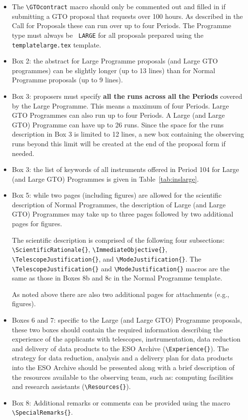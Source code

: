 \documentclass{article}
\begin{document}
\begin{itemize}
\item The \verb|\GTOcontract| macro should only be commented out and filled in if 
  submitting a GTO proposal that requests over 100 hours. As described in the Call for 
  Proposals these can run over up to four Periods. The Programme type must always be {\tt 
  LARGE} for all proposals prepared using the {\tt templatelarge.tex} template. 
\item Box 2: the abstract for Large Programme proposals (and Large GTO programmes) can be
  slightly longer (up to 13 lines) than for Normal Programme proposals
  (up to 9 lines).  
\item Box 3: proposers must specify {\bf all the runs across all the
  Periods} covered by the Large Programme. This means a maximum of four Periods. Large GTO 
  Programmes can also run up to four Periods. A Large (and Large GTO) Programme can have  
  up to 26 runs. Since the space for the runs
  description in Box 3 is limited to 12 lines, a new box containing
  the observing runs beyond this limit will be created at the end of
  the proposal form if needed.
\item Box 3: the list of keywords of all instruments offered in Period
  104 for Large (and Large GTO) Programmes is given in
  Table~\ref{tab:inslarge}.
\item Box 5: while two pages (including figures) are allowed for the scientific
  description of Normal Programmes, the
  description of Large (and Large GTO) Programmes may take up to three pages followed by
  two additional pages for figures.

  The scientific description is comprised of the following four subsections:
  \verb|\ScientificRationale{}|,
  \verb|\ImmediateObjective{}|, \verb|\TelescopeJustification{}|, and 
  \verb|\ModeJustification{}|.  
  The \linebreak \verb|\TelescopeJustification{}| and \verb|\ModeJustification{}|
  macros are the same as those in Boxes 8b and 8c in the Normal Programme
  template.
  
  As noted above there are also two additional pages for
  attachments (e.g., figures). 
\item Boxes 6 and 7: specific to the Large (and Large GTO) Programme proposals, these
  two boxes should contain the required information describing the
  experience of the applicants with telescopes, instrumentation, 
  data reduction  and delivery of data products to the ESO Archive 
  (\verb|\Experience{}|). The strategy for data reduction, analysis 
  and a delivery plan for data products into the ESO Archive should 
  be presented along with a brief description of the resources available
  to the observing team, such as: computing facilities and research
  assistants (\verb|\Resources{}|).
\item Box 8: Additional remarks or comments can be provided using
  the macro \verb|\SpecialRemarks{}|.
\end{itemize} 
\end{document}
